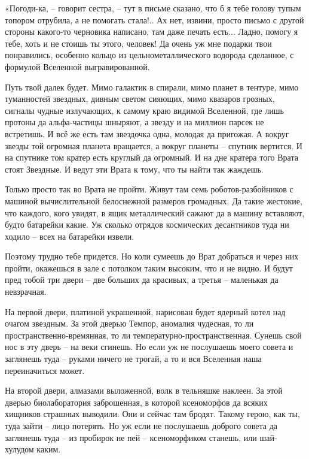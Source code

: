 \documentclass[ebook,oneside,final,openright]{memoir}
\begin{document}
\par
«Погоди-ка, – говорит сестра, – тут в письме сказано, что б я тебе голову тупым топором отрубила, а не помогать стала!.. Ах нет, извини, просто письмо с другой стороны какого-то черновика написано, там даже печать есть... Ладно, помогу я тебе, хоть и не стоишь ты этого, человек! Да очень уж мне подарки твои понравились, особенно кольцо из цельнометаллического водорода сделанное, с формулой Вселенной выгравированной.\par
\par
Путь твой далек будет. Мимо галактик в спирали, мимо планет в тентуре, мимо туманностей звездных, дивным светом сияющих, мимо квазаров грозных, сигналы чудные излучающих, к самому краю видимой Вселенной, где лишь протоны да альфа-частицы шныряют, а звезду и на миллион парсек не встретишь. И всё же есть там звездочка одна, молодая да пригожая. А вокруг звезды той огромная планета вращается, а вокруг планеты – спутник вертится. И на спутнике том кратер есть круглый да огромный. И на дне кратера того Врата стоят Звездные. И ведут эти Врата к тому, что ты найти так жаждешь.\par
\par
Только просто так во Врата не пройти. Живут там семь роботов-разбойников с машиной вычислительной белоснежной размеров громадных. Да такие жестокие, что каждого, кого увидят, в ящик металлический сажают да в машину вставляют, будто батарейки какие. Уж сколько отрядов космических десантников туда ни ходило – всех на батарейки извели.\par
\par
Поэтому трудно тебе придется. Но коли сумеешь до Врат добраться и через них пройти, окажешься в зале с потолком таким высоким, что и не видно. И будут пред тобой три двери – две больших да красивых, а третья – маленькая да невзрачная.\par
\par
На первой двери, платиной украшенной, нарисован будет ядерный котел над очагом звездным. За этой дверью Темпор, аномалия чудесная, то ли пространственно-времянная, то ли температурно-пространственная. Сунешь свой нос в эту дверь – на веки сгинешь. Но если уж не послушаешь моего совета и заглянешь туда – руками ничего не трогай, а то и вся Вселенная наша переиначиться может.\par
\par
На второй двери, алмазами выложенной, волк в тельняшке наклеен. За этой дверью биолаборатория заброшенная, в которой ксеноморфов да всяких хищников страшных выводили. Они и сейчас там бродят. Такому герою, как ты, туда зайти – лицо потерять. Но уж если не послушаешь доброго совета да заглянешь туда – из пробирок не пей – ксеноморфиком станешь, или шай-хулудом каким.\par
\end{document}
